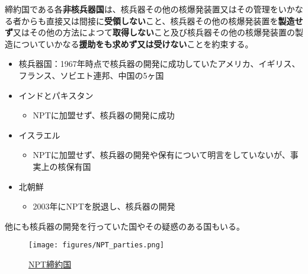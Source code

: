 \documentclass[
  xelatex,
  ja=standard]{bxjsarticle}
\providecommand{\tightlist}{%
  \setlength{\itemsep}{0pt}\setlength{\parskip}{0pt}}\usepackage{longtable,booktabs,array}
\begin{document}
\begin{tcolorbox}[enhanced jigsaw, opacityback=0, bottomtitle=1mm, arc=.35mm, opacitybacktitle=0.6, title=\textcolor{quarto-callout-note-color}{\faInfo}\hspace{0.5em}{\href{https://www1.doshisha.ac.jp/~karai/intlaw/docs/npt.htm}{核兵器不拡散条約}　第2条}, bottomrule=.15mm, coltitle=black, toptitle=1mm, titlerule=0mm, leftrule=.75mm, colframe=quarto-callout-note-color-frame, breakable, left=2mm, rightrule=.15mm, toprule=.15mm, colbacktitle=quarto-callout-note-color!10!white, colback=white]

締約国である各\textbf{非核兵器国}は、核兵器その他の核爆発装置又はその管理をいかなる者からも直接又は間接に\textbf{受領しない}こと、核兵器その他の核爆発装置を\textbf{製造せず}又はその他の方法によつて\textbf{取得しない}こと及び核兵器その他の核爆発装置の製造についていかなる\textbf{援助をも求めず又は受けない}ことを約束する。

\end{tcolorbox}

\begin{itemize}
\tightlist
\item
  核兵器国：1967年時点で核兵器の開発に成功していたアメリカ、イギリス、フランス、ソビエト連邦、中国の5ヶ国
\item
  インドとパキスタン

  \begin{itemize}
  \tightlist
  \item
    NPTに加盟せず、核兵器の開発に成功
  \end{itemize}
\item
  イスラエル

  \begin{itemize}
  \tightlist
  \item
    NPTに加盟せず、核兵器の開発や保有について明言をしていないが、事実上の核保有国
  \end{itemize}
\item
  北朝鮮

  \begin{itemize}
  \tightlist
  \item
    2003年にNPTを脱退し、核兵器の開発
  \end{itemize}
\end{itemize}

他にも核兵器の開発を行っていた国やその疑惑のある国もいる。

\begin{figure}[htpb]

{\centering \texttt{[image: figures/NPT\_parties.png]}

}

\caption{\href{https://commons.wikimedia.org/wiki/File:NPT_parties.svg}{NPT締約国}}

\end{figure}
\end{document}
